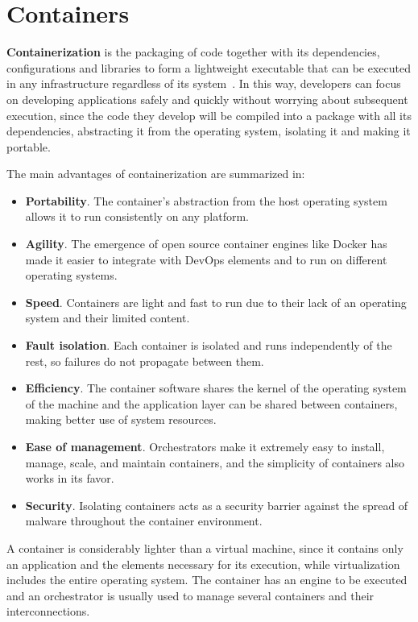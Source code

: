 \section{Containers}

\nonzeroparskip \textbf{Containerization} is the packaging of code together with its dependencies, configurations and libraries to form a lightweight executable that can be executed in any infrastructure regardless of its system~\cite{ibm_containerization}. In this way, developers can focus on developing applications safely and quickly without worrying about subsequent execution, since the code they develop will be compiled into a package with all its dependencies, abstracting it from the operating system, isolating it and making it portable.

\nonzeroparskip The main advantages of containerization are summarized in:
\begin{itemize}
	\item \textbf{Portability}. The container's abstraction from the host operating system allows it to run consistently on any platform.
	\item \textbf{Agility}. The emergence of open source container engines like Docker has made it easier to integrate with DevOps elements and to run on different operating systems.
	\item \textbf{Speed}. Containers are light and fast to run due to their lack of an operating system and their limited content.
	\item \textbf{Fault isolation}. Each container is isolated and runs independently of the rest, so failures do not propagate between them.
	\item \textbf{Efficiency}. The container software shares the kernel of the operating system of the machine and the application layer can be shared between containers, making better use of system resources.
	\item \textbf{Ease of management}. Orchestrators make it extremely easy to install, manage, scale, and maintain containers, and the simplicity of containers also works in its favor.
	\item \textbf{Security}. Isolating containers acts as a security barrier against the spread of malware throughout the container environment.
	\end{itemize}

\nonzeroparskip A container is considerably lighter than a virtual machine, since it contains only an application and the elements necessary for its execution, while virtualization includes the entire operating system. The container has an engine to be executed and an orchestrator is usually used to manage several containers and their interconnections.

